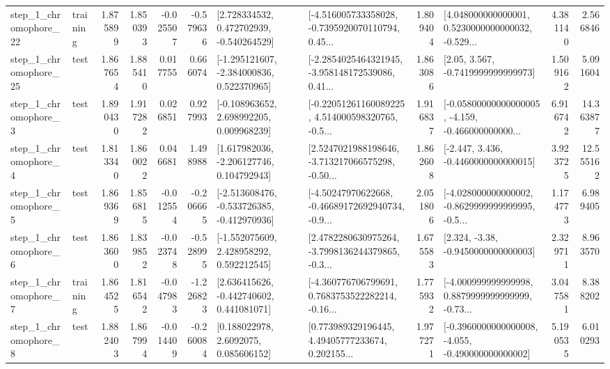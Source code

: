 \begin{tabular}{llrrrrllrlrr}
    step\_1\_chromophore\_22 &  training &      1.875899 &    1.850393 &     -0.025507 & -0.579636 &    [2.728334532, 0.472702939, -0.540264529] &  [-4.516005733358028, -0.7395920070110794, 0.45... &       1.809404 &  [4.048000000000001, 0.5230000000000032, -0.529... &            4.381140 &          2.566846 \\
    step\_1\_chromophore\_25 &      test &      1.867654 &    1.885410 &      0.017755 &  0.666074 &   [-1.295121607, -2.384000836, 0.522370965] &  [-2.2854025464321945, -3.958148172539086, 0.41... &       1.863086 &                 [2.05, 3.567, -0.7419999999999973] &            1.509162 &          5.091604 \\
     step\_1\_chromophore\_3 &      test &      1.890430 &    1.917282 &      0.026851 &  0.927993 &    [-0.108963652, 2.698992205, 0.009968239] &  [-0.22051261160089225, 4.514000598320765, -0.5... &       1.916837 &  [-0.05800000000000005, -4.159, -0.466000000000... &            6.916742 &         14.363877 \\
     step\_1\_chromophore\_4 &      test &      1.813340 &    1.860022 &      0.046681 &  1.498988 &    [1.617982036, -2.206127746, 0.104792943] &  [2.5247021988198646, -3.713217066575298, -0.50... &       1.862608 &               [-2.447, 3.436, -0.4460000000000015] &            3.923725 &         12.555162 \\
     step\_1\_chromophore\_5 &      test &      1.869369 &    1.856815 &     -0.012554 & -0.206665 &  [-2.513608476, -0.533726385, -0.412970936] &  [-4.50247970622668, -0.46689172692940734, -0.9... &       2.051806 &  [-4.028000000000002, -0.8629999999999995, -0.5... &            1.174773 &          6.989405 \\
     step\_1\_chromophore\_6 &      test &      1.863600 &    1.839852 &     -0.023748 & -0.528995 &    [-1.552075609, 2.428958292, 0.592212545] &  [2.4782280630975264, -3.7998136244379865, -0.3... &       1.675583 &                [2.324, -3.38, -0.9450000000000003] &            2.329711 &          8.963570 \\
     step\_1\_chromophore\_7 &  training &      1.864525 &    1.816542 &     -0.047983 & -1.226823 &    [2.636415626, -0.442740602, 0.441081071] &  [-4.360776706799691, 0.7683753522282214, -0.16... &       1.775932 &  [-4.000999999999998, 0.8879999999999999, -0.73... &            3.047581 &          8.388202 \\
     step\_1\_chromophore\_8 &      test &      1.882403 &    1.867994 &     -0.014409 & -0.260084 &       [0.188022978, 2.6092075, 0.085606152] &  [0.773989329196445, 4.49405777233674, 0.202155... &       1.977271 &  [-0.3960000000000008, -4.055, -0.490000000000002] &            5.190535 &          6.010293 \\

\end{tabular}
